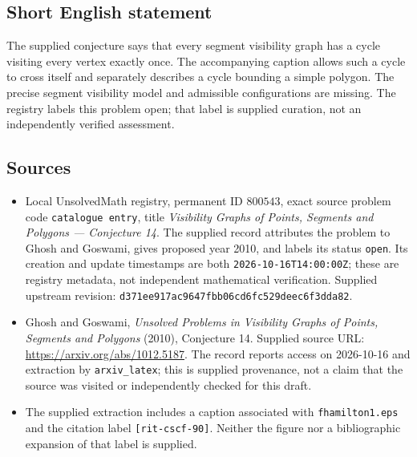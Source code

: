 \documentclass[11pt]{article}
\begin{document}
\subsection{Short English statement}
The supplied conjecture says that every segment visibility graph has a cycle visiting every vertex exactly once. The accompanying caption allows such a cycle to cross itself and separately describes a cycle bounding a simple polygon. The precise segment visibility model and admissible configurations are missing. The registry labels this problem open; that label is supplied curation, not an independently verified assessment.
\subsection{Sources}
\begin{itemize}
\item Local UnsolvedMath registry, permanent ID \(800543\), exact source problem code \texttt{catalogue entry}, title \emph{Visibility Graphs of Points, Segments and Polygons --- Conjecture 14}. The supplied record attributes the problem to Ghosh and Goswami, gives proposed year 2010, and labels its status \texttt{open}. Its creation and update timestamps are both \texttt{2026-10-16T14:00:00Z}; these are registry metadata, not independent mathematical verification. Supplied upstream revision: \texttt{d371ee917ac9647fbb06cd6fc529deec6f3dda82}.
\item Ghosh and Goswami, \emph{Unsolved Problems in Visibility Graphs of Points, Segments and Polygons} (2010), Conjecture 14. Supplied source URL: \url{https://arxiv.org/abs/1012.5187}. The record reports access on 2026-10-16 and extraction by \texttt{arxiv\_latex}; this is supplied provenance, not a claim that the source was visited or independently checked for this draft.
\item The supplied extraction includes a caption associated with \texttt{fhamilton1.eps} and the citation label \texttt{[rit-cscf-90]}. Neither the figure nor a bibliographic expansion of that label is supplied.
\end{itemize}
\end{document}
